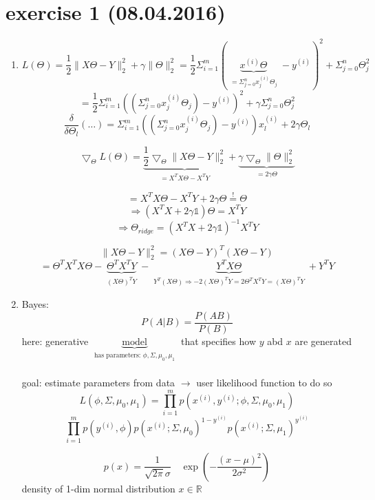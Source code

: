 \section*{exercise 1 (08.04.2016)}

\begin{enumerate}[(1)]
\item
\[L(\Theta) = \frac{1}{2} \lVert X \Theta - Y \lVert^2_2 + \gamma \lVert \Theta \lVert^2_2 = \frac{1}{2} \Sigma^m_{i=1}(\underbrace{x^{(i)}\Theta}_{\substack{= \Sigma^n_{j=0} x^{(i)}_j \Theta_j}}-y^{(i)})^2 +\Sigma^n_{j=0} \Theta_j^2\]
\[= \frac{1}{2}\Sigma^m_{i=1}((\Sigma^n_{j=0} x_j^{(i)} \Theta_j)-y^{(i)})^2 +\gamma \Sigma^n_{j=0} \Theta_j^2\]
\[ \frac{\delta}{\delta\Theta_l}(\dots) = \Sigma^m_{i=1}((\Sigma^n_{j=0} x_j^{(i)} \Theta_j)-y^{(i)})x_l^{(i)} + 2 \gamma \Theta_l\]

\[\bigtriangledown_\Theta L(\Theta) = \underbrace{\frac{1}{2}\bigtriangledown_\Theta \lVert X \Theta-Y \lVert^2_2}_{\substack{= X^TX \Theta - X^TY}} + \underbrace{\gamma \bigtriangledown_\Theta \lVert \Theta \lVert^2_2}_{\substack{= 2 \gamma\Theta}}\]

\[= X^T X \Theta - X^TY + 2 \gamma \Theta \stackrel{!}{=} \Theta\]
\[\Rightarrow (X^TX + 2\gamma \mathds{1}) \Theta = X^T Y\]
\[\Rightarrow \Theta_{ridge} = (X^TX +2 \gamma \mathds{1})^{-1} X^TY \]
\begin{framed}
\[\lVert X \Theta -Y \lVert^2_2 = (X \Theta -Y)^T (X\Theta -Y)\]
\[= \Theta^T X^T X \Theta - \underbrace{\Theta^T X^T Y}_{\substack{(X\Theta)^T Y}} - \underbrace{Y^T X \Theta}_{\substack{Y^T (X\Theta) \Rightarrow -2 (X \Theta)^T Y = 2\Theta^T X^T Y = (X \Theta)^T Y}} + Y^T Y\]
\end{framed}
\item
Bayes: \[P(A|B) = \frac{P(AB)}{P(B)}\]
here: generative $\underbrace{\text{model}}_{\substack{\text{has parameters: $\phi, \Sigma, \mu_0, \mu_1$}}}$ that specifies how $y$ abd $x$ are generated\\\\
goal: estimate parameters from data $\rightarrow$ user likelihood function to do so
\[L(\phi,\Sigma,\mu_0, \mu_1) = \prod^m_{i=1} p(x^{(i)}, y^{(i)}; \phi,\Sigma,\mu_0, \mu_1)\]
\[\prod^m_{i=1} p(y^{(i)}, \phi) p(x^{(i)}; \Sigma, \mu_0)^{1-y^{(i)}} p(x^{(i)}; \Sigma, \mu_1)^{y^{(i)}}\]
\begin{framed}
\[p(x) = \frac{1}{\sqrt{2\pi} \sigma} \quad \exp \left( - \frac{(x-\mu)^2}{2 \sigma^2}\right)\]
density of 1-dim normal distribution $x \in \mathbb{R}$
\end{framed}


\end{enumerate}
